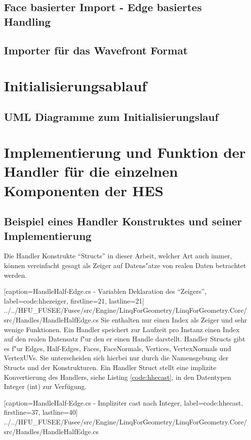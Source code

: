\documentclass[pagesize, paper=a4, fontsize=12pt,titlepage=true, headings=small, headnosepline, abstractoff, liststotoc, nochapterprefix, plainheadsepline]{scrreprt}
\begin{document}
		\subsection {Face basierter Import - Edge basiertes Handling}
		\subsection {Importer für das Wavefront Format}
	\section {Initialisierungsablauf}
		\subsection {UML Diagramme zum Initialisierungslauf}
	\section {Implementierung und Funktion der Handler für die einzelnen Komponenten der HES}
		\subsection {Beispiel eines Handler Konstruktes und seiner Implementierung}
Die Handler Konstrukte "`Structs"' in dieser Arbeit, welcher Art auch immer, können vereinfacht gesagt als Zeiger auf Datens"atze von realen Daten betrachtet werden.

			[caption={HandleHalf-Edge.cs - Variablen Deklaration des "`Zeigers"'}, label=code:hhezeiger, firstline=21, lastline=21]
			{../../HFU_FUSEE/Fusee/src/Engine/LinqForGeometry/LinqForGeometry.Core/src/Handles/HandleHalfEdge.cs}
Sie enthalten nur einen Index als Zeiger und sehr wenige Funktionen. Ein Handler speichert zur Laufzeit pro Instanz einen Index auf den realen Datensatz f"ur den er einen Handle darstellt. Handler Structs gibt es f"ur Edges, Half-Edges, Faces, FaceNormals, Vertices, VertexNormals und VertexUVs. Sie unterscheiden sich hierbei nur durch die Namensgebung der Structs und der Konstrukturen.
Ein Handler Struct stellt eine implizite Konvertierung des Handlers, siehe Listing \ref{code:hhecast}, in den Datentypen Integer (int) zur Verfügung.

			[caption={HandleHalf-Edge.cs - Impliziter cast nach Integer}, label=code:hhecast, firstline=37, lastline=40]
			{../../HFU_FUSEE/Fusee/src/Engine/LinqForGeometry/LinqForGeometry.Core/src/Handles/HandleHalfEdge.cs}
\end{document}
